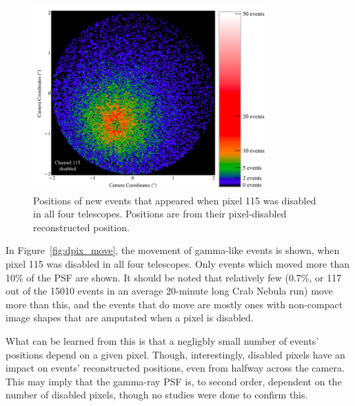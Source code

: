     \begin{figure}[ht]
      \centering
      \includegraphics[width=0.8\textwidth]{images/disabled_pixel/appearing_events}
      \caption[New Events that Appear when Disabling Camera Pixels]{
        Positions of new events that appeared when pixel 115 was disabled in all four telescopes.
        Positions are from their pixel-disabled reconstructed position.
      }
      \label{fig:dpix_appear}
    \end{figure}

    In Figure~\ref{fig:dpix_move}, the movement of gamma-like events is shown, when pixel 115 was disabled in all four telescopes.
    Only events which moved more than 10\% of the PSF are shown.
    It should be noted that relatively few (0.7\%, or 117 out of the 15010 events in an average 20-minute long Crab Nebula run) move more than this, and the events that do move are mostly ones with non-compact image shapes that are amputated when a pixel is disabled.

    What can be learned from this is that a negligbly small number of events' positions depend on a given pixel.
    Though, interestingly, disabled pixels have an impact on events' reconstructed positions, even from halfway across the camera.
    This may imply that the gamma-ray PSF is, to second order, dependent on the number of disabled pixels, though no studies were done to confirm this.

